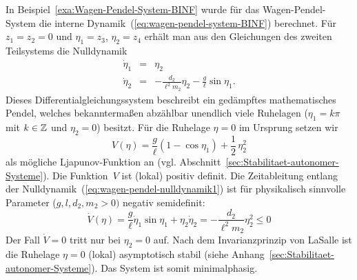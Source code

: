 \begin{example}
\label{exa:wagen-pendel-system-nulldynamik1}In Beispiel~\ref{exa:Wagen-Pendel-System-BINF}
wurde für das Wagen-Pendel-System die interne Dynamik~(\ref{eq:wagen-pendel-system-BINF})
berechnet. Für $z_{1}=z_{2}=0$ und $\eta_{1}=z_{3}$, $\eta_{2}=z_{4}$
erhält man aus den Gleichungen des zweiten Teilsystems die Nulldynamik
\begin{equation}
\begin{array}{lcl}
\dot{\eta}_{1} & = & \eta_{2}\\
\dot{\eta}_{2} & = & -\frac{d_{2}}{\ell^{2}m_{2}}\eta_{2}-\frac{g}{\ell}\sin\eta_{1}.
\end{array}\label{eq:wagen-pendel-nulldynamik1}
\end{equation}
Dieses Differentialgleichungssystem beschreibt ein gedämpftes mathematisches
Pendel, welches bekanntermaßen abzählbar unendlich viele Ruhelagen
($\eta_{1}=k\pi$ mit $k\in{\mathbb{Z}}$ und $\eta_{2}=0$) besitzt. Für die
Ruhelage $\eta=0$ im Ursprung setzen wir 
\[
V(\eta)=\frac{g}{\ell}\left(1-\cos\eta_{1}\right)+\frac{1}{2}\,\eta_{2}^{2}
\]
als mögliche Ljapunov-Funktion an (vgl.
Abschnitt~\ref{sec:Stabilitaet-autonomer-Systeme}). Die Funktion~$V$
ist (lokal) positiv definit. Die Zeitableitung entlang der Nulldynamik~(\ref{eq:wagen-pendel-nulldynamik1})
ist für physikalisch sinnvolle Parameter ($g,l,d_{2},m_{2}>0)$ negativ
semidefinit:
\[
\dot{V}(\eta)=\frac{g}{\ell}\dot{\eta}_{1}\sin\eta_{1}+\eta_{2}\dot{\eta}_{2}=-\frac{d_{2}}{\ell^{2}m_{2}}\eta_{2}^{2}\leq0
\]
Der Fall $\dot{V}=0$ tritt nur bei $\eta_{2}=0$ auf. Nach dem Invarianzprinzip
von LaSalle ist die Ruhelage $\eta=0$ (lokal) asymptotisch stabil
(siehe Anhang~\ref{sec:Stabilitaet-autonomer-Systeme}). Das System
ist somit minimalphasig.
\end{example}

